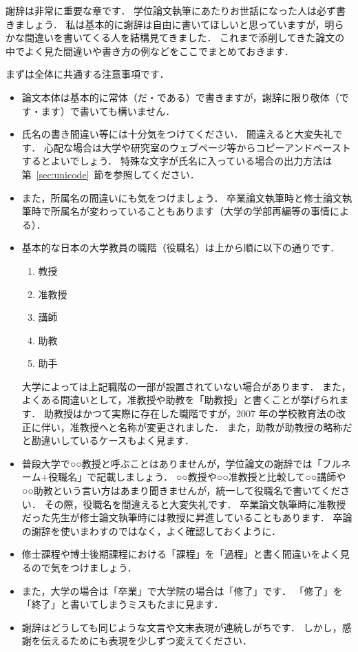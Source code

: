 \acknowledge

謝辞は非常に重要な章です．
学位論文執筆にあたりお世話になった人は必ず書きましょう．
私は基本的に謝辞は自由に書いてほしいと思っていますが，明らかな間違いを書いてくる人を結構見てきました．
これまで添削してきた論文の中でよく見た間違いや書き方の例などをここでまとめておきます．

まずは全体に共通する注意事項です．
\begin{itemize}
    \item 論文本体は基本的に常体（だ・である）で書きますが，謝辞に限り敬体（です・ます）で書いても構いません．
    \item 氏名の書き間違い等には十分気をつけてください．
    間違えると大変失礼です．
    心配な場合は大学や研究室のウェブページ等からコピーアンドペーストするとよいでしょう．
    特殊な文字が氏名に入っている場合の出力方法は第~\ref{sec:unicode}~節を参照してください．
    \item また，所属名の間違いにも気をつけましょう．
    卒業論文執筆時と修士論文執筆時で所属名が変わっていることもあります（大学の学部再編等の事情による）．
    \item 基本的な日本の大学教員の職階（役職名）は上から順に以下の通りです．
    \begin{enumerate}
        \item 教授
        \item 准教授
        \item 講師
        \item 助教
        \item 助手
    \end{enumerate}
    大学によっては上記職階の一部が設置されていない場合があります．
    また，よくある間違いとして，准教授や助教を「助教授」と書くことが挙げられます．
    助教授はかつて実際に存在した職階ですが，2007 年の学校教育法の改正に伴い，准教授へと名称が変更されました．
    また，助教が助教授の略称だと勘違いしているケースもよく見ます．
    \item 普段大学で○○教授と呼ぶことはありませんが，学位論文の謝辞では「フルネーム$+$役職名」で記載しましょう．
    ○○教授や○○准教授と比較して○○講師や○○助教という言い方はあまり聞きませんが，統一して役職名で書いてください．
    その際，役職名を間違えると大変失礼です．
    卒業論文執筆時に准教授だった先生が修士論文執筆時には教授に昇進していることもあります．
    卒論の謝辞を使いまわすのではなく，よく確認しておくように．
    \item 修士課程や博士後期課程における「課程」を「過程」と書く間違いをよく見るので気をつけましょう．
    \item また，大学の場合は「卒業」で大学院の場合は「修了」です．
    「修了」を「終了」と書いてしまうミスもたまに見ます．
    \item 謝辞はどうしても同じような文言や文末表現が連続しがちです．
    しかし，感謝を伝えるためにも表現を少しずつ変えてください．
\end{itemize}

